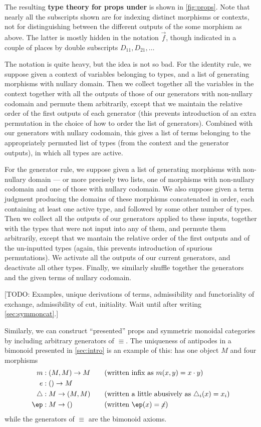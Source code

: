 \documentclass{book}
\begin{document}
The resulting \textbf{type theory for props under \cG} is shown in \cref{fig:props}.
Note that nearly all the subscripts shown are for indexing distinct morphisms or contexts, not for distinguishing between the different outputs of the some morphism as above.
The latter is mostly hidden in the notation $\vec f$, though indicated in a couple of places by double subscripts $D_{11}, D_{21},\dots$

The notation is quite heavy, but the idea is not so bad.
For the identity rule, we suppose given a context of variables belonging to types, and a list of generating morphisms with nullary domain.
Then we collect together all the variables in the context together with all the outputs of those of our generators with non-nullary codomain and permute them arbitrarily, except that we maintain the relative order of the first outputs of each generator (this prevents introduction of an extra permutation in the choice of how to order the list of generators).
Combined with our generators with nullary codomain, this gives a list of terms belonging to the appropriately permuted list of types (from the context and the generator outputs), in which all types are active.

For the generator rule, we suppose given a list of generating morphisms with non-nullary domain --- or more precisely two lists, one of morphisms with non-nullary codomain and one of those with nullary codomain.
We also suppose given a term judgment producing the domains of these morphisms concatenated in order, each containing at least one active type, and followed by some other number of types.
Then we collect all the outputs of our generators applied to these inputs, together with the types that were not input into any of them, and permute them arbitrarily, except that we mantain the relative order of the first outputs and of the un-inputted types (again, this prevents introduction of spurious permutations).
We activate all the outputs of our current generators, and deactivate all other types.
Finally, we similarly shuffle together the generators and the given terms of nullary codomain.

[TODO: Examples, unique derivations of terms, admissibility and functoriality of exchange, admissibility of cut, initiality.  Wait until after writing \cref{sec:symmoncat}.]


\newpage

Similarly, we can construct ``presented'' props and symmetric monoidal categories by including arbitrary generators of $\equiv$.
The uniqueness of antipodes in a bimonoid presented in \cref{sec:intro} is an example of this: \cG has one object $M$ and four morphisms
\begin{alignat*}{2}
m&:(M,M)\to M &&\quad\text{(written infix as $m(x,y) = x\cdot y$)}\\
e&:()\to M\\
\triangle&:M\to (M,M) &&\quad\text{(written a little abusively as $\triangle_i(x) = x_i$)}\\
\ep &:M\to () &&\quad\text{(written $\ep(x) = \cancel{x}$)}
\end{alignat*}
while the generators of $\equiv$ are the bimonoid axioms.
\end{document}
